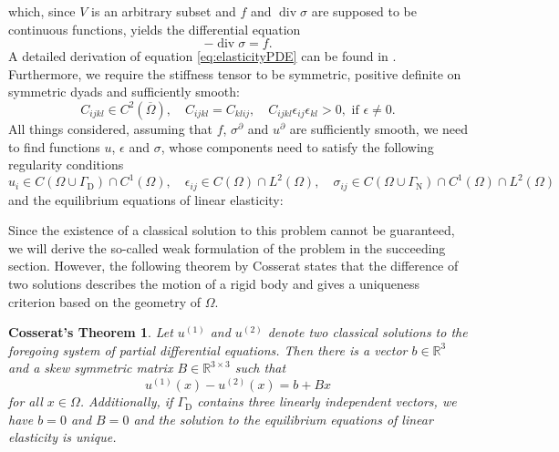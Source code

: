 \documentclass[a4paper, 11pt, twoside]{article}
\theoremstyle{plain}
\newtheorem*{Co}{Cosserat's Theorem}
\theoremstyle{definition}
\DeclareMathOperator\Div{div}
\newcommand{\R}{\mathbb{R}}
\begin{document}
which, since $V$ is an arbitrary subset and $f$ and $\Div \sigma$ are supposed to be continuous functions, yields the differential equation
\begin{equation}
 -\Div\sigma = f.
 \label{eq:elasticityPDE}
\end{equation}
A detailed derivation of equation \eqref{eq:elasticityPDE} can be found in \cite{braess}.
Furthermore, we require the stiffness tensor to be symmetric, positive definite on symmetric dyads and sufficiently smooth:
\begin{equation}
 C_{ijkl} \in C^2 (\overline{\Omega}), \quad C_{ijkl} = C_{klij}, \quad C_{ijkl}\epsilon_{ij}\epsilon_{kl} > 0, \text{ if }  \epsilon \neq 0.
\end{equation}
All things considered, assuming that $f$, $\sigma^\partial$ and $u^\partial$ are sufficiently smooth, we need to find functions $u$, $\epsilon$ and $\sigma$, whose components need to satisfy the following regularity conditions
\begin{equation}
 u_i \in C(\Omega \cup \Gamma_\text{D}) \cap C^1(\Omega), \quad
 \epsilon_{ij} \in C(\Omega) \cap L^2(\Omega), \quad
 \sigma_{ij} \in C(\Omega \cup \Gamma_\text{N}) \cap C^1(\Omega) \cap L^2(\Omega)
\end{equation}
and the equilibrium equations of linear elasticity:
\begin{center}\framebox[6.0cm]{\parbox[c][3.5cm]{15.5cm}{
{ \begin{alignat}{2}
 -\Div \sigma &= f &\quad& \text{ on }\Omega, \label{eq:elasticity} \\
 u        &= u^\partial && \text{ on }\Gamma_\text{D}, \\
 n \sigma &= g && \text{ on }\Gamma_\text{N}, \\
 \frac{1}{2} \left( \nabla u + \nabla u ^ T \right) &= \epsilon && \text{ on }\Omega, \\
 \sigma   &= C\epsilon && \text{ on }\Omega.
\end{alignat}
}}}\end{center}
Since the existence of a classical solution to this problem cannot be guaranteed, we will derive the so-called weak formulation of the problem in the succeeding section. 
However, the following theorem by Cosserat states that the difference of two solutions describes the motion of a rigid body and gives a uniqueness criterion based on the geometry of $\Omega$.
\begin{Co}
Let $u^{(1)}$ and $u^{(2)}$ denote two classical solutions to the foregoing system of partial differential equations.
Then there is a vector $b \in \R^3$ and a skew symmetric matrix $B \in \R^{3 \times 3}$ such that 
\begin{equation}
	u^{(1)}(x) - u^{(2)}(x) = b + B x
\end{equation}
for all $x \in \Omega$.
Additionally, if $\Gamma_{\text{D}}$ contains three linearly independent vectors, we have $b=0$ and $B=0$ and the solution to the equilibrium equations of linear elasticity is unique.
\end{Co}
\end{document}
